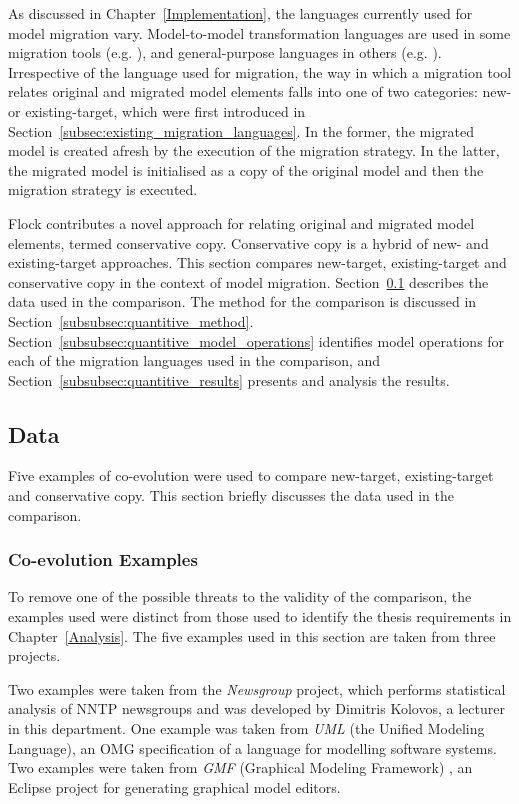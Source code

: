 As discussed in Chapter~\ref{Implementation}, the languages currently used for model migration vary. Model-to-model transformation languages are used in some migration tools (e.g. \cite{cicchetti08automating,garces09managing}), and general-purpose languages in others (e.g. \cite{herrmannsdoerfer09cope,hussey06advanced}). Irrespective of the language used for migration, the way in which a migration tool relates original and migrated model elements falls into one of two categories: new- or existing-target, which were first introduced in Section~\ref{subsec:existing_migration_languages}. In the former, the migrated model is created afresh by the execution of the migration strategy. In the latter, the migrated model is initialised as a copy of the original model and then the migration strategy is executed.

Flock contributes a novel approach for relating original and migrated model elements, termed conservative copy. Conservative copy is a hybrid of new- and existing-target approaches. This section compares new-target, existing-target and conservative copy in the context of model migration. Section~\ref{subsubsec:quantitive_data} describes the data used in the comparison. The method for the comparison is discussed in Section~\ref{subsubsec:quantitive_method}. Section~\ref{subsubsec:quantitive_model_operations} identifies model operations for each of the migration languages used in the comparison, and Section~\ref{subsubsec:quantitive_results} presents and analysis the results.

\subsection{Data}
\label{subsubsec:quantitive_data}
Five examples of co-evolution were used to compare new-target, existing-target and conservative copy. This section briefly discusses the data used in the comparison.

\subsubsection{Co-evolution Examples}
To remove one of the possible threats to the validity of the comparison, the examples used were distinct from those used to identify the thesis requirements in Chapter~\ref{Analysis}. The five examples used in this section are taken from three projects.

Two examples were taken from the \emph{Newsgroup} project, which performs statistical analysis of NNTP newsgroups and was developed by Dimitris Kolovos, a lecturer in this department. One example was taken from \emph{UML} (the Unified Modeling Language), an OMG specification of a language for modelling software systems. Two examples were taken from \emph{GMF} (Graphical Modeling Framework) \cite{gronback09emp}, an Eclipse project for generating graphical model editors.

